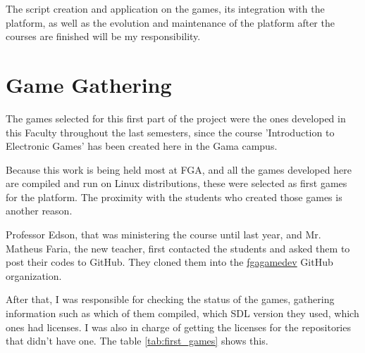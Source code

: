 The script creation and application on the games, its integration with the platform, as well as the evolution and maintenance of the platform after the courses are finished will be my responsibility.


\section[Game Gathering]{Game Gathering}

The games selected for this first part of the project were the ones developed in this Faculty throughout the last semesters, since the course 'Introduction to Electronic Games' has been created here in the Gama campus.

Because this work is being held most at FGA, and all the games developed here are compiled and run on Linux distributions, these were selected as first games for the platform. The proximity with the students who created those games is another reason.

Professor Edson, that was ministering the course until last year, and Mr. Matheus Faria, the new teacher, first contacted the students and asked them to post their codes to GitHub. They cloned them into the \href{https://github.com/fgagamedev/}{fgagamedev} GitHub organization.

After that, I was responsible for checking the status of the games, gathering information such as which of them compiled, which SDL version they used, which ones had licenses. I was also in charge of getting the licenses for the repositories that didn't have one. The table \ref{tab:first_games} shows this.

